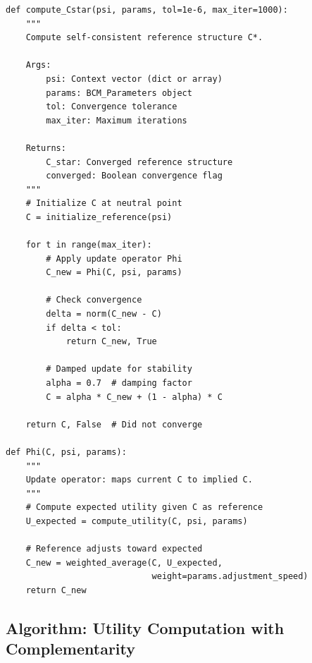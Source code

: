 \begin{tcolorbox}[colback=gray!5!white, colframe=gray!75!black,
    title=Implementation AZ-S1: Fixed-Point Iteration for $C^*$]
\begin{verbatim}
def compute_Cstar(psi, params, tol=1e-6, max_iter=1000):
    """
    Compute self-consistent reference structure C*.

    Args:
        psi: Context vector (dict or array)
        params: BCM_Parameters object
        tol: Convergence tolerance
        max_iter: Maximum iterations

    Returns:
        C_star: Converged reference structure
        converged: Boolean convergence flag
    """
    # Initialize C at neutral point
    C = initialize_reference(psi)

    for t in range(max_iter):
        # Apply update operator Phi
        C_new = Phi(C, psi, params)

        # Check convergence
        delta = norm(C_new - C)
        if delta < tol:
            return C_new, True

        # Damped update for stability
        alpha = 0.7  # damping factor
        C = alpha * C_new + (1 - alpha) * C

    return C, False  # Did not converge

def Phi(C, psi, params):
    """
    Update operator: maps current C to implied C.
    """
    # Compute expected utility given C as reference
    U_expected = compute_utility(C, psi, params)

    # Reference adjusts toward expected
    C_new = weighted_average(C, U_expected,
                             weight=params.adjustment_speed)
    return C_new
\end{verbatim}
\end{tcolorbox}

\subsection{Algorithm: Utility Computation with Complementarity}

